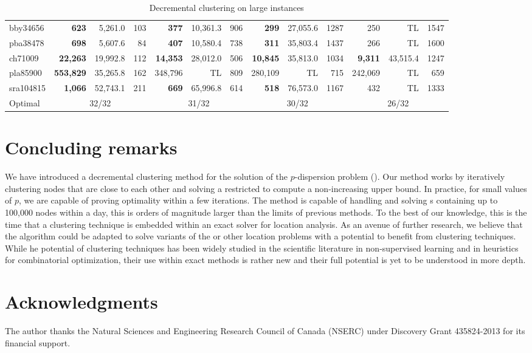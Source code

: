\documentclass[ijoo,nonblindrev]{informs-ijoo}
\begin{document}
\begin{table}[!hbtp]
{\begin{tabular}{|l|rrr|rrr|rrr|rrr|}
			bby34656 & \textbf{623} & 5,261.0 & 103 & \textbf{377} & 10,361.3 & 906 & \textbf{299} & 27,055.6 & 1287 & 250 & TL & 1547\\
			pba38478 & \textbf{698} & 5,607.6 & 84 & \textbf{407} & 10,580.4 & 738 & \textbf{311} & 35,803.4 & 1437 & 266 & TL & 1600\\
			ch71009 & \textbf{22,263} & 19,992.8 & 112 & \textbf{14,353} & 28,012.0 & 506 & \textbf{10,845} & 35,813.0 & 1034 & \textbf{9,311} & 43,515.4 & 1247\\
			pla85900 & \textbf{553,829} & 35,265.8 & 162 & 348,796 & TL & 809 & 280,109 & TL & 715 & 242,069 & TL & 659\\
			sra104815 & \textbf{1,066} & 52,743.1 & 211 & \textbf{669} & 65,996.8 & 614 & \textbf{518} & 76,573.0 & 1167 & 432 & TL & 1333\\
			\hline
			Optimal & \multicolumn{3}{|c|}{32/32} & \multicolumn{3}{|c|}{31/32} & \multicolumn{3}{|c|}{30/32} & \multicolumn{3}{|c|}{26/32}\\
			\hline
	\end{tabular}}
	\caption{Decremental clustering on large instances\label{table:large}}
\end{table}

\section{Concluding remarks\label{section:conclusions}}

We have introduced a decremental clustering method for the solution of the $p$-dispersion problem (\pDP{}). Our method works by iteratively clustering nodes that are close to each other and solving a restricted \pDP{} to compute a non-increasing upper bound. In practice, for small values of $p$, we are capable of proving optimality within a few iterations. The method is capable of handling and solving \pDP{}s containing up to 100,000 nodes within a day, this is orders of magnitude larger than the limits of previous methods. To the best of our knowledge, this is the time that a clustering technique is embedded within an exact solver for location analysis. As an avenue of further research, we believe that the algorithm could be adapted to solve variants of the \pDP{} or other location problems with a potential to benefit from clustering techniques. While he potential of clustering techniques has been widely studied in the scientific literature in non-supervised learning and in heuristics for combinatorial optimization, their use within exact methods is rather new and their full potential is yet to be understood in more depth.

\section*{Acknowledgments}

The author thanks the Natural Sciences and Engineering Research Council of Canada (NSERC) under Discovery Grant 435824-2013 for its financial support.



\end{document}
